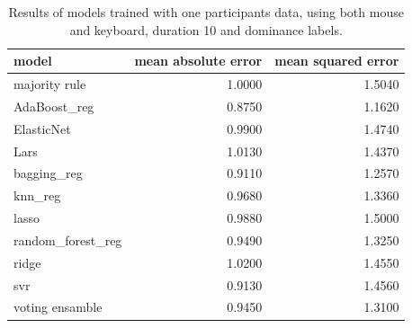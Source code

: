 \begin{table}[!h]
    \centering
    \begin{tabular}{lrr}
        \toprule
                     model &  mean absolute error &  mean squared error \\
        \midrule
             majority rule &               1.0000 &              1.5040 \\
              AdaBoost\_reg &               0.8750 &              1.1620 \\
                ElasticNet &               0.9900 &              1.4740 \\
                      Lars &               1.0130 &              1.4370 \\
               bagging\_reg &               0.9110 &              1.2570 \\
                   knn\_reg &               0.9680 &              1.3360 \\
                     lasso &               0.9880 &              1.5000 \\
         random\_forest\_reg &               0.9490 &              1.3250 \\
                     ridge &               1.0200 &              1.4550 \\
                       svr &               0.9130 &              1.4560 \\
           voting ensamble &               0.9450 &              1.3100 \\
        \bottomrule
    \end{tabular}
    \caption{Results of models trained with one participants data, using both mouse and keyboard, duration 10 and dominance labels.}     
\end{table}

